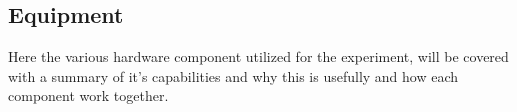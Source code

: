 \subsection{Equipment}
Here the various hardware component utilized for the experiment, will be covered with a summary of it's capabilities and why this is usefully and how each component work together.




